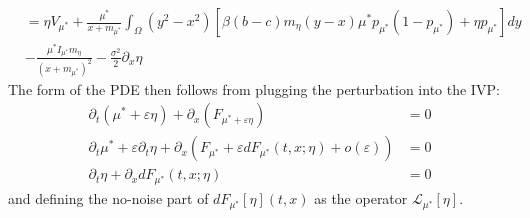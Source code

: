 \documentclass[10pt]{article}
\begin{document}
\begin{align*}
      &= \eta V_{\mu^*} + \frac{\mu^*}{{x+m_{\mu^*}} }\int_\Omega(y^2-x^2)[\beta(b-c)m_\eta(y-x)\mu^*p_{\mu^*}(1-p_{\mu^*}) + \eta p_{\mu^*}]dy\\& - \frac{\mu^*I_{\mu^*} m_\eta}{(x+m_{\mu^*})^2} - \frac{\sigma^2}{2}\partial_x\eta 
\end{align*}
The form of the PDE then follows from plugging the perturbation into the IVP:
\begin{align*}
    \partial_t(\mu^* + \varepsilon \eta) + \partial_x( F_{\mu^* + \varepsilon \eta}) &=0\\
        \partial_t\mu^* + \varepsilon \partial_t\eta + \partial_x(F_{\mu^*}+\varepsilon dF_{\mu^*}(t,x;\eta) + o(\varepsilon)) &=0\\
        \partial_t\eta + \partial_x dF_{\mu^*}(t,x;\eta) &=0
\end{align*}
and defining the no-noise part of $dF_{\mu^*}[\eta](t,x)$ as the operator $\mathcal{L}_{\mu^*}[\eta]$.
\end{document}
